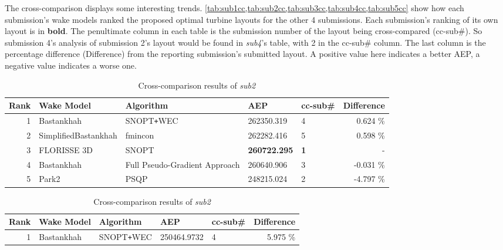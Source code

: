 	The cross-comparison displays some interesting trends.
	\cref{tab:sub1cc,tab:sub2cc,tab:sub3cc,tab:sub4cc,tab:sub5cc} show how each submission's wake models ranked the proposed optimal turbine layouts for the other 4 submissions.
	Each submission's ranking of its own layout is in \textbf{bold}.
	The penultimate column in each table is the submission number of the layout being cross-compared (cc-sub\#).
	So submission 4's analysis of submission 2's layout would be found in \textit{sub4}'s table, with 2 in the cc-sub\# column.
	The last column is the percentage difference (Difference) from the reporting submission's submitted layout.
	A positive value here indicates a better AEP, a negative value indicates a worse one.

		\begin{table}[htbp]
			\begin{center}
			\caption{Cross-comparison results of \textit{sub1}}
			\label{tab:sub1cc}
				\begin{tabular}{r l l l l r}
					\hline
					Rank		& Wake Model 			& Algorithm										& AEP					& cc-sub\#	& Difference	\\
					\hline
						1		& Bastankhah			& SNOPT\texttt{+}WEC 							& 262350.319			& 4 		& 0.624 \%\\	
						2		& SimplifiedBastankhah	& fmincon										& 262282.416			& 5 		& 0.598 \%\\
						3		& FLORISSE 3D			& SNOPT											& \textbf{260722.295}	& \textbf{1}& - \\
						4		& Bastankhah			& Full Pseudo-Gradient Approach					& 260640.906			& 3 		&-0.031 \%\\
						5		& Park2					& PSQP											& 248215.024			& 2 		&-4.797 \%\\
					\hline
				\end{tabular}
			\end{center}
			\begin{center}
			\caption{Cross-comparison results of \textit{sub2}}
			\label{tab:sub2cc}
				\begin{tabular}{r l l l l r}
					\hline
					Rank		& Wake Model 			& Algorithm										& AEP					& cc-sub\#	& Difference	\\
					\hline
						1		& Bastankhah			& SNOPT\texttt{+}WEC 							& 250464.9732			& 4 		& 5.975 \%\\	

\end{tabular}
\end{center}
\end{table}
